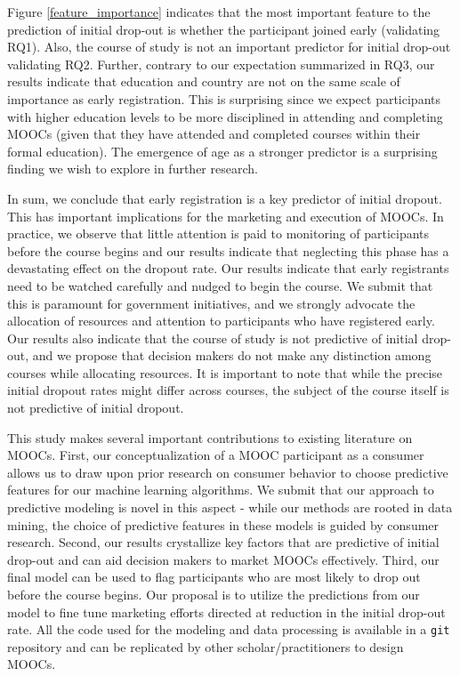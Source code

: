 \documentclass[12pt,]{article}
\begin{document}
Figure \ref{feature_importance} indicates that the most important
feature to the prediction of initial drop-out is whether the participant
joined early (validating RQ1). Also, the course of study is not an
important predictor for initial drop-out validating RQ2. Further,
contrary to our expectation summarized in RQ3, our results indicate that
education and country are not on the same scale of importance as early
registration. This is surprising since we expect participants with
higher education levels to be more disciplined in attending and
completing MOOCs (given that they have attended and completed courses
within their formal education). The emergence of age as a stronger
predictor is a surprising finding we wish to explore in further
research.

In sum, we conclude that early registration is a key predictor of
initial dropout. This has important implications for the marketing and
execution of MOOCs. In practice, we observe that little attention is
paid to monitoring of participants before the course begins and our
results indicate that neglecting this phase has a devastating effect on
the dropout rate. Our results indicate that early registrants need to be
watched carefully and nudged to begin the course. We submit that this is
paramount for government initiatives, and we strongly advocate the
allocation of resources and attention to participants who have
registered early. Our results also indicate that the course of study is
not predictive of initial drop-out, and we propose that decision makers
do not make any distinction among courses while allocating resources. It
is important to note that while the precise initial dropout rates might
differ across courses, the subject of the course itself is not
predictive of initial dropout.

This study makes several important contributions to existing literature
on MOOCs. First, our conceptualization of a MOOC participant as a
consumer allows us to draw upon prior research on consumer behavior to
choose predictive features for our machine learning algorithms. We
submit that our approach to predictive modeling is novel in this aspect
- while our methods are rooted in data mining, the choice of predictive
features in these models is guided by consumer research. Second, our
results crystallize key factors that are predictive of initial drop-out
and can aid decision makers to market MOOCs effectively. Third, our
final model can be used to flag participants who are most likely to drop
out before the course begins. Our proposal is to utilize the predictions
from our model to fine tune marketing efforts directed at reduction in
the initial drop-out rate. All the code used for the modeling and data
processing is available in a \texttt{git} repository and can be
replicated by other scholar/practitioners to design MOOCs.
\end{document}
